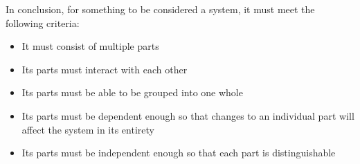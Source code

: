 \documentclass[11pt]{article}
\begin{document}
\par In conclusion, for something to be considered a system, it must meet the following criteria:
\begin{itemize}
\item It must consist of multiple parts
\item Its parts must interact with each other
\item Its parts must be able to be grouped into one whole
\item Its parts must be dependent enough so that changes to an individual part will affect the system in its entirety
\item Its parts must be independent enough so that each part is distinguishable
\end{itemize}








	





	








\end{document}
